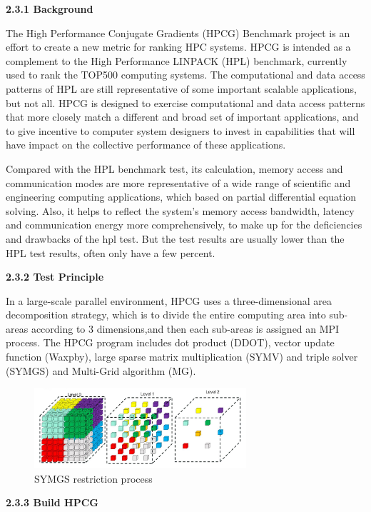 \documentclass[a4paper,12pt]{article}
\begin{document}
\textbf{2.3.1 Background}

The High Performance Conjugate Gradients (HPCG) Benchmark project is an effort to create a new metric for ranking HPC systems. HPCG is intended as a complement to the High Performance LINPACK (HPL) benchmark, currently used to rank the TOP500 computing systems. The computational and data access patterns of HPL are still representative of some important scalable applications, but not all. HPCG is designed to exercise computational and data access patterns that more closely match a different and broad set of important applications, and to give incentive to computer system designers to invest in capabilities that will have impact on the collective performance of these applications.

Compared with the HPL benchmark test, its calculation, memory access and communication modes are more representative of a wide range of scientific and engineering computing applications, which based on partial differential equation solving. Also, it helps to reflect the system's memory access bandwidth, latency and communication energy more comprehensively, to make up for the deficiencies and drawbacks of the hpl test. But the test results are usually lower than the HPL test results, often only have a few percent.

\textbf{2.3.2 Test Principle}

In a large-scale parallel environment, HPCG uses a three-dimensional area decomposition strategy, which is to divide the entire computing area into sub-areas according to 3 dimensions,and then each sub-areas is assigned an MPI process. The HPCG program includes dot product (DDOT), vector update function (Waxpby), large sparse matrix multiplication (SYMV) and triple solver (SYMGS) and Multi-Grid algorithm (MG).

\begin{figure}[H]
    \centering
    \includegraphics[width=0.7\textwidth]{SYMGS_restriction_process.png}
    \caption{SYMGS restriction process}
    \label{fig:symgs_restriction}
\end{figure}

\textbf{2.3.3 Build HPCG}
\end{document}
